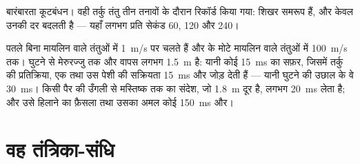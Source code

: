 \begin{omfigure}

{\small बारंबारता कूटबंधन। वही तर्कु तंतु तीन तनावों के दौरान रिकॉर्ड किया
गया: शिखर समरूप हैं, और केवल उनकी दर बदलती है --- यहाँ लगभग प्रति सेकंड 60,
120 और 240।}
\end{omfigure}

\begin{example}[रफ़्तार]\label{ex:g12:stretch-reflex:speed}
 पतले बिना मायलिन वाले तंतुओं में \qty{1}{m/s} पर चलते हैं और  के मोटे मायलिन वाले तंतुओं में \qty{100}{m/s} तक। घुटने से
मेरुरज्जु तक और वापस लगभग \qty{1.5}{m} है: यानी कोई \qty{15}{ms} का सफ़र,
जिसमें तर्कु की प्रतिक्रिया, एक  तथा उस पेशी की सक्रियता
\qty{15}{ms} और जोड़ देती हैं --- यानी घुटने की उछाल के वे \qty{30}{ms}।
किसी पैर की उँगली से मस्तिष्क तक का संदेश, जो \qty{1.8}{m} दूर है, लगभग
\qty{20}{ms} लेता है; और उसे हिलाने का फ़ैसला तथा उसका अमल कोई \qty{150}{ms}
और।
\end{example}

\section{वह तंत्रिका-संधि}

